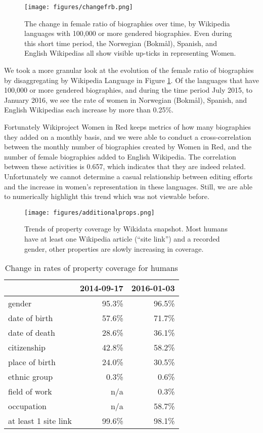 \documentclass{sig-alternate-05-2015}
\begin{document}
\begin{figure}
\texttt{[image: figures/changefrb.png]}

\caption{The change in female ratio of biographies over time, by Wikipedia languages with 100,000 or more gendered biographies. Even during this short time period, the Norwegian (Bokm\aa l), Spanish, and English Wikipedias all show visible up-ticks in representing Women.}

\label{fig:changefrb}
\end{figure}

We took a more granular look at the evolution of the female ratio of biographies by disaggregating by Wikipedia Language in Figure \ref{fig:changefrb}. Of the languages that have 100,000 or more gendered biographies, and during the time period July 2015, to January 2016, we see the rate of women in Norwegian (Bokm\aa l), Spanish, and English Wikipedias each increase by more than 0.25\%.

Fortunately Wikiproject Women in Red keeps metrics of how many biographies they added on a monthly basis, and we were able to conduct a cross-correlation between the monthly number of biographies created by Women in Red, and the number of female biographies added to English Wikipedia. The correlation between these activities is 0.657, which indicates that they are indeed related. Unfortunately we cannot determine a casual relationship between editing efforts and the increase in women's representation in these languages. Still, we are able to numerically highlight this trend which was not viewable before.


\begin{figure}
\texttt{[image: figures/additionalprops.png]}
\caption{Trends of property coverage by Wikidata snapshot. Most humans have at least one Wikipedia article (``site link'') and a recorded gender, other properties are slowly increasing in coverage.}
\label{fig:accompanying}
\end{figure}


\begin{table}
\caption{Change in rates of property coverage for humans}
\begin{tabular}{lrr}
\toprule
{} &  2014-09-17 &  2016-01-03 \\
\midrule
gender               &       95.3\% &       96.5\% \\
date of birth        &       57.6\% &       71.7\% \\
date of death        &       28.6\% &       36.1\% \\
citizenship          &       42.8\% &       58.2\% \\
place of birth       &       24.0\% &       30.5\% \\
ethnic group         &        0.3\% &        0.6\% \\
field of work        &        n/a &        0.3\% \\
occupation           &        n/a &       58.7\% \\
at least 1 site link &       99.6\% &       98.1\% \\
\bottomrule
\end{tabular}
\label{table:accompanying}
\end{table}
\end{document}
